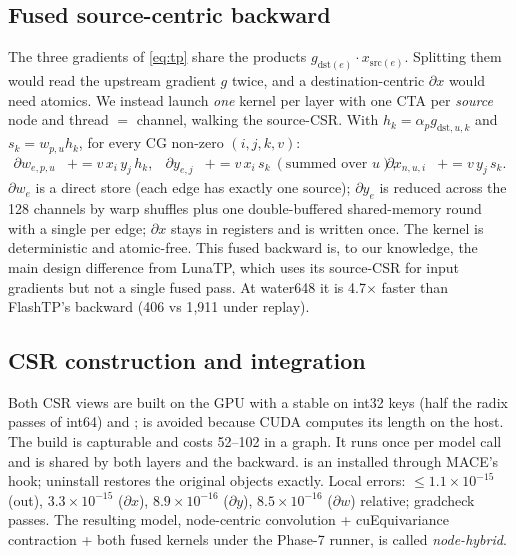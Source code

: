 \subsection{Fused source-centric backward}
The three gradients of \cref{eq:tp} share the products $g_{\mathrm{dst}(e)}\cdot x_{\mathrm{src}(e)}$. Splitting them would read the upstream gradient $g$ twice, and a destination-centric $\partial x$ would need atomics. We instead launch \emph{one} kernel per layer with one CTA per \emph{source} node and thread $=$ channel, walking the source-CSR. With $h_k=\alpha_p g_{\mathrm{dst},u,k}$ and $s_k=w_{p,u}h_k$, for every CG non-zero $(i,j,k,v)$:
\begin{align}
  \partial w_{e,p,u} &\mathrel{+}= v\,x_i\,y_j\,h_k, &
  \partial y_{e,j} &\mathrel{+}= v\,x_i\,s_k \ (\text{summed over } u), &
  \partial x_{n,u,i} &\mathrel{+}= v\,y_j\,s_k .
\end{align}
$\partial w_e$ is a direct store (each edge has exactly one source); $\partial y_e$ is reduced across the 128 channels by warp shuffles plus one double-buffered shared-memory round with a single  per edge; $\partial x$ stays in registers and is written once. The kernel is deterministic and atomic-free. This fused backward is, to our knowledge, the main design difference from LunaTP, which uses its source-CSR for input gradients but not a single fused pass. At water648 it is 4.7$\times$ faster than FlashTP's backward (406 vs 1{,}911\us{} under replay).

\subsection{CSR construction and integration}
Both CSR views are built on the GPU with a stable  on int32 keys (half the radix passes of int64) and ;  is avoided because CUDA  computes its length on the host. The build is capturable and costs 52--102\us{} in a graph. It runs once per model call and is shared by both layers and the backward.  is an  installed through MACE's  hook; uninstall restores the original objects exactly. Local errors: $\le1.1\times10^{-15}$ (out), $3.3\times10^{-15}$ ($\partial x$), $8.9\times10^{-16}$ ($\partial y$), $8.5\times10^{-16}$ ($\partial w$) relative; gradcheck passes. The resulting model, node-centric convolution + cuEquivariance contraction + both fused kernels under the Phase-7 runner, is called \emph{node-hybrid}.

